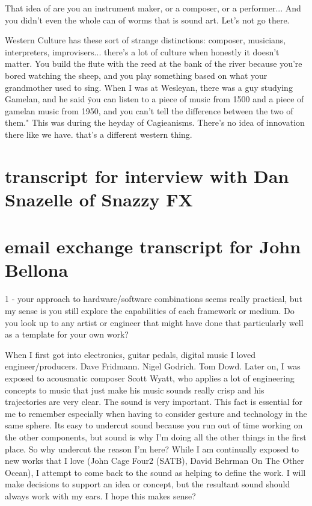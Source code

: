 That idea of are you an instrument maker, or a composer, or a performer... And you didn't even the whole can of worms that is sound art. Let's not go there. 

Western Culture has these sort of strange distinctions: composer, musicians, interpreters, improvisers... there's a lot of culture when honestly it doesn't matter. You build the flute with the reed at the bank of the river because you're bored watching the sheep, and you play something based on what your grandmother used to sing. When I was at Wesleyan, there was a guy studying Gamelan, and he said \"you can listen to a piece of music from 1500 and a piece of gamelan music from 1950, and you can't tell the difference between the two of them." This was during the heyday of Cagieanisms. There's no idea of innovation there like we have. that's a different western thing. 

\section{transcript for interview with Dan Snazelle of Snazzy FX}
\section{email exchange transcript for John Bellona}

1 - your approach to hardware/software combinations seems really practical, but my sense is you still explore the capabilities of each framework or medium. Do you look up to any artist or engineer that might have done that particularly well as a template for your own work? 

When I first got into electronics, guitar pedals, digital music I loved engineer/producers. Dave Fridmann. Nigel Godrich. Tom Dowd.
  Later on, I was exposed to acousmatic composer Scott Wyatt, who applies a lot of engineering concepts to music that just make his music sounds really crisp and his trajectories are very clear. The sound is very important. This fact is essential for me to remember especially when having to consider gesture and technology in the same sphere. Its easy to undercut sound because you run out of time working on the other components, but sound is why I'm doing all the other things in the first place. So why undercut the reason I'm here?  While I am continually exposed to new works that I love (John Cage Four2 (SATB), David Behrman On The Other Ocean), I attempt to come back to the sound as helping to define the work. I will make decisions to support an idea or concept, but the resultant sound should always work with my ears. I hope this makes sense?

